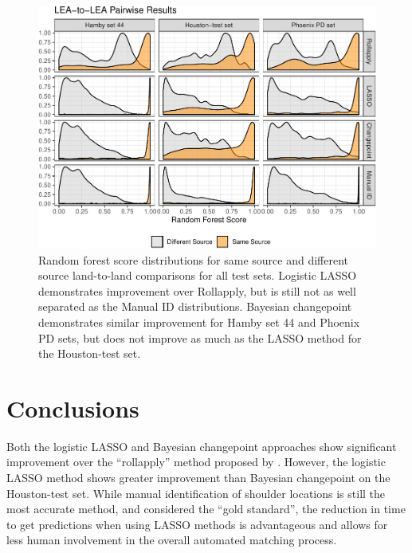 \documentclass[12pt]{article}
\begin{document}
\begin{figure}
\centering
\includegraphics{writeup_files/figure-latex/all-results-1.pdf}
\caption{\label{houston-groove-results}Random forest score distributions
for same source and different source land-to-land comparisons for all
test sets. Logistic LASSO demonstrates improvement over Rollapply, but
is still not as well separated as the Manual ID distributions. Bayesian
changepoint demonstrates similar improvement for Hamby set 44 and
Phoenix PD sets, but does not improve as much as the LASSO method for
the Houston-test set.}
\end{figure}

\section{Conclusions}

Both the logistic LASSO and Bayesian changepoint approaches show
significant improvement over the ``rollapply'' method proposed by
\cite{Hare1}. However, the logistic LASSO method shows greater
improvement than Bayesian changepoint on the Houston-test set. While
manual identification of shoulder locations is still the most accurate
method, and considered the ``gold standard'', the reduction in time to
get predictions when using LASSO methods is advantageous and allows for
less human involvement in the overall automated matching process.
{\color{teal}{Although manual identification of GEA data would still be the best safeguard against false positives in LEA-to-LEA matching, as it leads to the most accurate results, either Bayesian changepoint or logistic LASSO could be applied in the automated process if the matching scores are used as a validation of a human examiner's decision. Examiners can either use the automated process as a validation of their decision, or determine at which point in the process they disagree with the automated algorithm and explain how and why their decision differs. When used as a validation support tool, the implications of a false positive from the automated process are much less problematic.}}
{\color{purple}{What are the implications of a false positive? That depends on whether I am willing to give up accuracy in favor of "speed" and more (incorrect) objectivity.}}
\end{document}
